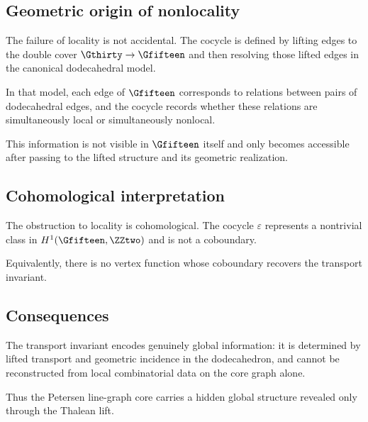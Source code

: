 \subsection{Geometric origin of nonlocality}

The failure of locality is not accidental. The cocycle is defined by
lifting edges to the double cover $\Gthirty\to\Gfifteen$ and then resolving
those lifted edges in the canonical dodecahedral model.

In that model, each edge of $\Gfifteen$ corresponds to relations between
pairs of dodecahedral edges, and the cocycle records whether these
relations are simultaneously local or simultaneously nonlocal.

This information is not visible in $\Gfifteen$ itself and only becomes
accessible after passing to the lifted structure and its geometric
realization.

\subsection{Cohomological interpretation}

The obstruction to locality is cohomological. The cocycle $\varepsilon$
represents a nontrivial class in $H^1(\Gfifteen,\ZZtwo)$ and is not a
coboundary.

Equivalently, there is no vertex function whose coboundary recovers the
transport invariant.

\subsection{Consequences}

The transport invariant encodes genuinely global information: it is
determined by lifted transport and geometric incidence in the
dodecahedron, and cannot be reconstructed from local combinatorial data
on the core graph alone.

Thus the Petersen line-graph core carries a hidden global structure
revealed only through the Thalean lift.
